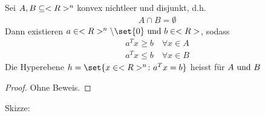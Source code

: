 \begin{theorem}
	Sei $A,B \subseteq <R>^n$ konvex nichtleer und disjunkt, d.h.
	\begin{align*}
		A \cap B = \emptyset
	\end{align*}
	Dann existieren $a \in \R^n \setminus \set{0} \und b \in \R$, sodass
	\begin{align*}
		a^T x \ge b \quad \forall x \in A\\
		a^T x \le b \quad \forall x \in B
	\end{align*}
	Die Hyperebene $h = \set{x \in \R^n \colon a^T x = b}$ heisst  für $A \text{ und } B$
\end{theorem}
\begin{proof}
	Ohne Beweis.
\end{proof}
Skizze: 
